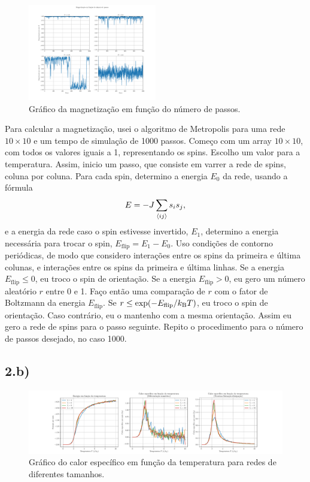 \documentclass[a4paper, brazil]{article}
\begin{document}
    \begin{figure}[ht]
        \centering
        \includegraphics[width=0.5\textwidth]{fig_2a2.pdf}
        \caption{Gráfico da magnetização em função do número de passos.}\label{fig2a2}
    \end{figure}

    Para calcular a magnetização, usei o algoritmo de Metropolis para uma rede \( 10 \times 10 \) e um tempo de simulação de 1000 passos.
    Começo com um array \( 10 \times 10 \), com todos os valores iguais a 1, representando os spins.
    Escolho um valor para a temperatura.
    Assim, inicio um passo, que consiste em varrer a rede de spins, coluna por coluna.
    Para cada spin, determino a energia \( E_0 \) da rede, usando a fórmula
    \begin{equation}
        E = - J \sum_{\expval{i j}} s_i s_j ,
    \end{equation}
    e a energia da rede caso o spin estivesse invertido, \( E_1 \), determino a energia necessária para trocar o spin, \( E_\text{flip} = E_1 - E_0 \).
    Uso condições de contorno periódicas, de modo que considero interações entre os spins da primeira e última colunas, e interações entre os spins da primeira e última linhas.
    Se a energia \( E_\text{flip} \leq 0 \), eu troco o spin de orientação.
    Se a energia \( E_\text{flip} > 0 \), eu gero um número aleatório \( r \) entre 0 e 1.
    Faço então uma comparação de \( r \) com o fator de Boltzmann da energia \( E_\text{flip} \).
    Se \( r \leq \exp( - E_\text{flip} / k_\text{B} T) \), eu troco o spin de orientação.
    Caso contrário, eu o mantenho com a mesma orientação.
    Assim eu gero a rede de spins para o passo seguinte.
    Repito o procedimento para o número de passos desejado, no caso 1000.


\newpage
\subsection*{2.b)}

    \begin{figure}[ht]
        \centering
        \includegraphics[width=\textwidth]{fig_2b.pdf}
        \caption{Gráfico do calor específico em função da temperatura para redes de diferentes tamanhos.}\label{fig2b}
    \end{figure}
\end{document}

